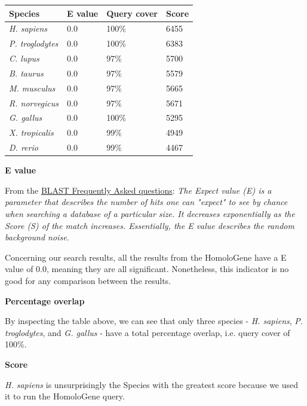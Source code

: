 \begin{center}
	\begin{tabu} to \textwidth{ | X[c] | X[c] | X[c] | X[c] | }
		\hline
		Species & E value & Query cover & Score \\
		\hline
        \textit{H. sapiens}     & 0.0 & 100\% & 6455 \\
        \textit{P. troglodytes} & 0.0 & 100\% & 6383 \\
        \textit{C. lupus}       & 0.0 &  97\% & 5700 \\
        \textit{B. taurus}      & 0.0 &  97\% & 5579 \\
        \textit{M. musculus}    & 0.0 &  97\% & 5665 \\
        \textit{R. norvegicus}  & 0.0 &  97\% & 5671 \\
        \textit{G. gallus}      & 0.0 & 100\% & 5295 \\
        \textit{X. tropicalis}  & 0.0 &  99\% & 4949 \\
        \textit{D. rerio}       & 0.0 &  99\% & 4467 \\
		\hline
	\end{tabu}
\end{center}

\bigskip

\textbf{E value}

From the \href{https://blast.ncbi.nlm.nih.gov/blast/Blast.cgi?CMD=Web&PAGE_TYPE=BlastDocs&DOC_TYPE=FAQ#expect}{BLAST Frequently Asked questions}: \textit{The Expect value (E) is a parameter that describes the number of hits one can "expect" to see by chance when searching a database of a particular size. It decreases exponentially as the Score (S) of the match increases. Essentially, the E value describes the random background noise.}

Concerning our search results, all the results from the HomoloGene have a E value of 0.0, meaning they are all significant. Nonetheless, this indicator is no good for any comparison between the results.

\bigskip

\textbf{Percentage overlap}

By inspecting the table above, we can see that only three species - \textit{H. sapiens}, \textit{P. troglodytes}, and \textit{G. gallus} - have a total percentage overlap, i.e. query cover of 100\%.

\bigskip

\textbf{Score}

\textit{H. sapiens} is unsurprisingly the Species with the greatest score because we used it to run the HomoloGene query.

